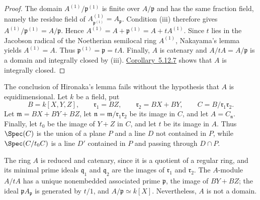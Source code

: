 \begin{proof}
The domain $A^{(1)}/\mathfrak p^{(1)}$ is finite over
$A/\mathfrak p$ and has the same fraction field, namely the
residue field of
$A^{(1)}_{\mathfrak p^{(1)}}=A_{\mathfrak p}$.  Condition
{\rm(iii)} therefore gives $A^{(1)}/\mathfrak p^{(1)}=A/\mathfrak p$.
Hence $A^{(1)}=A+\mathfrak p^{(1)}=A+tA^{(1)}$.
Since $t$ lies in the Jacobson radical of the Noetherian
semilocal ring $A^{(1)}$, Nakayama's lemma yields
$A^{(1)}=A$.  Thus $\mathfrak p^{(1)}=\mathfrak p=tA$.
Finally, $A$ is catenary and
$A/tA=A/\mathfrak p$ is a domain and integrally closed by
{\rm(iii)}.  {\hyperref[IV.5.12.7]{Corollary~5.12.7}} shows that $A$ is integrally
closed.
\end{proof}

\begin{remark}[5.12.9]
\label{IV.5.12.9}
The conclusion of Hironaka's lemma fails without the hypothesis
that $A$ is equidimensional.  Let $k$ be a field, put
\[
  B=k[X,Y,Z],\qquad
  \mathfrak r_1=BZ,\qquad
  \mathfrak r_2=BX+BY,\qquad
  C=B/\mathfrak r_1\mathfrak r_2.
\]
Let $\mathfrak m=BX+BY+BZ$, let
$\mathfrak n=\mathfrak m/\mathfrak r_1\mathfrak r_2$ be its
image in $C$, and let $A=C_{\mathfrak n}$.  Finally, let $t_0$
be the image of $Y+Z$ in $C$, and let $t$ be its image in $A$.
Thus $\Spec(C)$ is the union of a plane $P$ and a line $D$ not
contained in $P$, while $\Spec(C/t_0C)$ is a line $D'$ contained
in $P$ and passing through $D\cap P$.

The ring $A$ is reduced and catenary, since it is a quotient of a
regular ring, and its minimal prime ideals $\mathfrak q_1$ and
$\mathfrak q_2$ are the images of $\mathfrak r_1$ and
$\mathfrak r_2$.  The $A$-module $A/tA$ has a unique
nonembedded associated prime $\mathfrak p$, the image of
$BY+BZ$; the ideal $\mathfrak pA_{\mathfrak p}$ is generated by
$t/1$, and $A/\mathfrak p\simeq k[X]$.  Nevertheless, $A$ is
not a domain.
\end{remark}

